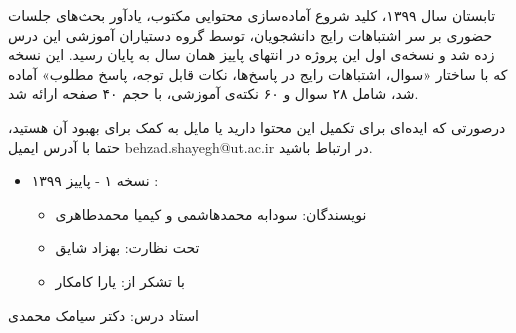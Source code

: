 \documentclass[11pt,largemargins]{h2wp}
\begin{document}
تابستان سال ۱۳۹۹، کلید شروع آماده‌سازی محتوایی مکتوب، یادآور بحث‌های جلسات حضوری بر سر اشتباهات رایج دانشجویان، توسط
گروه دستیاران آموزشی این درس زده شد و نسخه‌ی اول این پروژه در انتهای پاییز همان سال به پایان رسید.
این نسخه که با ساختار «سوال، اشتباهات رایج در پاسخ‌ها، نکات قابل توجه، پاسخ مطلوب» آماده شد، شامل ۲۸ سوال و ۶۰ نکته‌ی آموزشی،
با حجم ۴۰ صفحه ارائه شد.

درصورتی که ایده‌ای برای تکمیل این محتوا دارید یا مایل به کمک برای بهبود آن هستید، حتما با آدرس ایمیل 
behzad.shayegh@ut.ac.ir
در ارتباط باشید.

\begin{itemize}
  \item 
  نسخه ۱ - پاییز ۱۳۹۹ :
  \begin{itemize}
    \item 
    نویسندگان: سودابه محمدهاشمی و کیمیا محمدطاهری
    \item 
    تحت نظارت: بهزاد شایق
    \item 
    با تشکر از: یارا کامکار
  \end{itemize}
\end{itemize}
  استاد درس: دکتر سیامک محمدی
\end{document}
